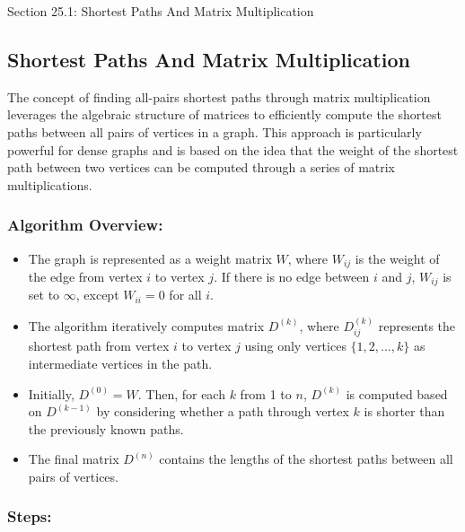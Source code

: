 \begin{notes}{Section 25.1: Shortest Paths And Matrix Multiplication}
    \subsection*{Shortest Paths And Matrix Multiplication}

    The concept of finding all-pairs shortest paths through matrix multiplication leverages the algebraic structure of matrices to efficiently compute the shortest paths between all pairs of vertices 
    in a graph. This approach is particularly powerful for dense graphs and is based on the idea that the weight of the shortest path between two vertices can be computed through a series of matrix 
    multiplications. \vspace*{1em}
    
    \subsubsection*{Algorithm Overview:}
    
    \begin{itemize}
        \item The graph is represented as a weight matrix $W$, where $W_{ij}$ is the weight of the edge from vertex $i$ to vertex $j$. If there is no edge between $i$ and $j$, $W_{ij}$ is set to $\infty$, 
        except $W_{ii}=0$ for all $i$.
        \item The algorithm iteratively computes matrix $D^{(k)}$, where $D^{(k)}_{ij}$ represents the shortest path from vertex $i$ to vertex $j$ using only vertices $\{1, 2, ..., k\}$ as intermediate 
        vertices in the path.
        \item Initially, $D^{(0)} = W$. Then, for each $k$ from 1 to $n$, $D^{(k)}$ is computed based on $D^{(k-1)}$ by considering whether a path through vertex $k$ is shorter than the previously known paths.
        \item The final matrix $D^{(n)}$ contains the lengths of the shortest paths between all pairs of vertices.
    \end{itemize}
    
    \subsubsection*{Steps:}
    

\end{notes}
